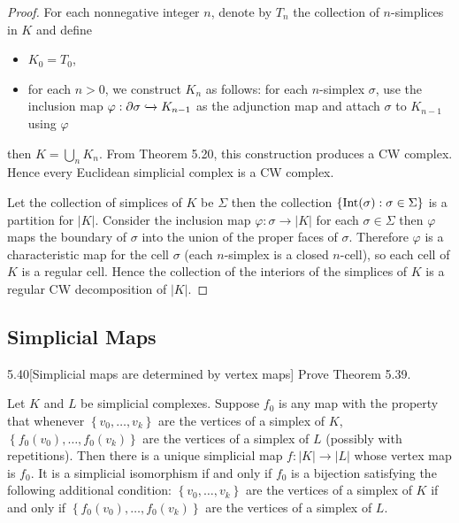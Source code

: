 \begin{proof}
	For each nonnegative integer \( n \), denote by \( T_{n} \) the collection of \( n \)-simplices in \( K \) and define
	\begin{itemize}[leftmargin=*,itemsep=0pt]
		\item \( K_{0} = T_{0} \),
		\item for each \( n > 0 \), we construct \( K_{n} \) as follows: for each \( n \)-simplex \( \sigma \), use the inclusion map \( \varphi: \partial \sigma \xhookrightarrow{} K_{n-1} \) as the adjunction map and attach \( \sigma \) to \( K_{n-1} \) using \( \varphi \)
	\end{itemize}

	then \( K = \bigcup_{n} K_{n} \). From Theorem 5.20, this construction produces a CW complex. Hence every Euclidean simplicial complex is a CW complex.

	Let the collection of simplices of \( K \) be \( \Sigma \) then the collection \( \left\{{ \operatorname{Int}(\sigma): \sigma \in \Sigma }\right\} \) is a partition for \( \left\vert K \right\vert \). Consider the inclusion map \( \varphi: \sigma \to \left\vert K \right\vert \) for each \( \sigma \in \Sigma \) then \( \varphi \) maps the boundary of \( \sigma \) into the union of the proper faces of \( \sigma \). Therefore \( \varphi \) is a characteristic map for the cell \( \sigma \) (each \( n \)-simplex is a closed \( n \)-cell), so each cell of \( K \) is a regular cell. Hence the collection of the interiors of the simplices of \( K \) is a regular CW decomposition of \( \left\vert K \right\vert \).
\end{proof}

\subsection*{Simplicial Maps}

\begin{exercise}{5.40}[Simplicial maps are determined by vertex maps]
	Prove Theorem 5.39.

	Let \( K \) and \( L \) be simplicial complexes. Suppose \( f_{0} \) is any map with the property that whenever \( \left\{ v_{0}, \ldots, v_{k} \right\} \) are the vertices of a simplex of \( K \), \( \left\{ f_{0}(v_{0}), \ldots, f_{0}(v_{k}) \right\} \) are the vertices of a simplex of \( L \) (possibly with repetitions). Then there is a unique simplicial map \( f: \left\vert K \right\vert \to \left\vert L \right\vert \) whose vertex map is \( f_{0} \). It is a simplicial isomorphism if and only if \( f_{0} \) is a bijection satisfying the following additional condition:  \( \left\{ v_{0}, \ldots, v_{k} \right\} \) are the vertices of a simplex of \( K \) if and only if \( \left\{ f_{0}(v_{0}), \ldots, f_{0}(v_{k}) \right\} \) are the vertices of a simplex of \( L \).
\end{exercise}

